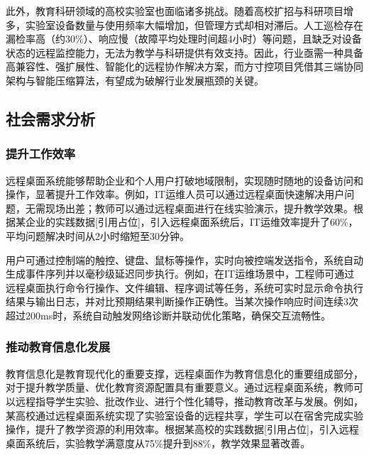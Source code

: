 \documentclass[12pt,a4paper]{article}
\renewcommand{\cite}[1]{[引用占位]}
\begin{document}
此外，教育科研领域的高校实验室也面临诸多挑战。随着高校扩招与科研项目增多，实验室设备数量与使用频率大幅增加，但管理方式却相对滞后。人工巡检存在漏检率高（约30\%）、响应慢（故障平均处理时间超4小时）等问题，且缺乏对设备状态的远程监控能力，无法为教学与科研提供有效支持。因此，行业亟需一种具备高兼容性、强扩展性、智能化的远程协作解决方案，而方寸控项目凭借其三端协同架构与智能压缩算法，有望成为破解行业发展瓶颈的关键。

\subsection{社会需求分析}

\subsubsection{提升工作效率}

远程桌面系统能够帮助企业和个人用户打破地域限制，实现随时随地的设备访问和操作，显著提升工作效率。例如，IT运维人员可以通过远程桌面快速解决用户问题，无需现场出差；教师可以通过远程桌面进行在线实验演示，提升教学效果。根据某企业的实践数据\cite{case2023efficiency}，引入远程桌面系统后，IT运维效率提升了60\%，平均问题解决时间从2小时缩短至30分钟。

用户可通过控制端的触控、键盘、鼠标等操作，实时向被控端发送指令，系统自动生成事件序列并以毫秒级延迟同步执行。例如，在IT运维场景中，工程师可通过远程桌面执行命令行操作、文件编辑、程序调试等任务，系统可实时显示命令执行结果与输出日志，并对比预期结果判断操作正确性。当某次操作响应时间连续3次超过200ms时，系统自动触发网络诊断并联动优化策略，确保交互流畅性。

\subsubsection{推动教育信息化发展}

教育信息化是教育现代化的重要支撑，远程桌面作为教育信息化的重要组成部分，对于提升教学质量、优化教育资源配置具有重要意义。通过远程桌面系统，教师可以远程指导学生实验、批改作业、进行个性化辅导，推动教育改革与发展。例如，某高校通过远程桌面系统实现了实验室设备的远程共享，学生可以在宿舍完成实验操作，提升了教学资源的利用效率。根据某高校的实践数据\cite{case2023education}，引入远程桌面系统后，实验教学满意度从75\%提升到88\%，教学效果显著改善。
\end{document}
